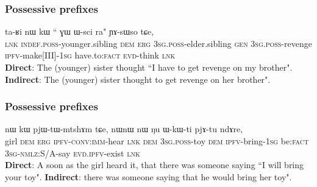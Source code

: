 \documentclass[xcolor=table]{beamer}
\newcommand{\rouge}[1]{{\color{red}#1}}
\newcommand{\bleu}[1]{{\color{blue}#1}}
\newcommand{\ipa}[1]{{\phon #1}} %
\begin{document}
 
 
   \begin{frame} 
   \frametitle{Possessive prefixes}
\begin{exe}
\ex
\gll  \ipa{tɕe}  	\ipa{ta-ʁi}  	\ipa{nɯ}  	\ipa{kɯ}  	``\rouge{\ipa{ɯ-pi}}  	\ipa{ɣɯ}  	\ipa{ɯ-sci}  	\bleu{\ipa{tu-nɤme-a}}  	\ipa{ra}" 	\ipa{ɲɤ-sɯso}  	\ipa{tɕe,}  	\\
\textsc{lnk}  \textsc{indef.poss}-younger.sibling \textsc{dem} \textsc{erg}  \rouge{\textsc{3sg.poss}-elder.sibling}  \textsc{gen} \textsc{3sg.poss}-revenge \bleu{\textsc{ipfv}-make[III]-\textsc{1sg}} have.to:\textsc{fact} \textsc{evd}-think \textsc{lnk} \\
\glt  \textbf{Direct}: The (younger) sister thought ``\bleu{I have to get revenge} on \rouge{my brother}".
\glt  \textbf{Indirect}:  The (younger) sister thought  to get revenge on \rouge{her brother}".
  \end{exe}
 \end{frame} 
 

    \begin{frame} 
       \frametitle{Possessive prefixes}
\begin{exe}
\ex
\gll   \ipa{tɤɕime}  	\ipa{nɯ}  	\ipa{kɯ}  	\ipa{pjɯ-tɯ-mtshɤm}  	\ipa{tɕe,}  	\ipa{nɯnɯ}  \rouge{\ipa{ɯ-kɯmtɕhɯ}}  	\ipa{nɯ}  	\bleu{\ipa{ju-ɣɯt-a}}  	\ipa{ŋu}  		\ipa{ɯ-kɯ-ti}  	\ipa{pjɤ-tu}  	\ipa{ndɤre,}  \\
girl \textsc{dem} \textsc{erg} \textsc{ipfv-conv:imm}-hear \textsc{lnk} \textsc{dem} \rouge{\textsc{3sg.poss}-toy} \textsc{dem} \bleu{\textsc{ipfv}-bring-\textsc{1sg}}  be:\textsc{fact} \textsc{3sg-nmlz}:S/A-say \textsc{evd.ipfv}-exist \textsc{lnk} \\
\glt   \textbf{Direct}: A soon as the girl heard it, that there was someone saying ``\bleu{I will bring} \rouge{your toy}".
\glt   \textbf{Indirect}: there was someone saying that he would bring \rouge{her toy}".
  \end{exe}
 \end{frame} 
\end{document}
